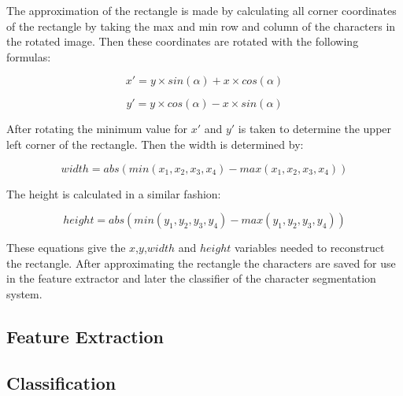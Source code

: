 The approximation of the rectangle is made by calculating  all corner coordinates of the rectangle by taking the max and min row and column of the characters in the rotated image. Then these coordinates are rotated with the following formulas:

\begin{equation}
    x' = y \times sin(\alpha) + x \times cos(\alpha)
\end{equation}

\begin{equation}
    y' = y \times cos(\alpha) - x \times sin(\alpha)
\end{equation}

After rotating the minimum value for $x'$ and $y'$ is taken to determine the upper left corner of the rectangle. Then the width is determined by:

\begin{equation}
    width = abs(min(x_1,x_2,x_3,x_4) - max(x_1,x_2,x_3,x_4))
\end{equation}

The height is calculated in a similar fashion:

\begin{equation}
    height = abs(min(y_1,y_2,y_3,y_4) - max(y_1,y_2,y_3,y_4))
\end{equation}

These equations give the $x$,$y$,$width$ and $height$ variables needed to reconstruct the rectangle. After approximating the rectangle the characters are saved for use in the feature extractor and later the classifier of the character segmentation system.

\subsection{Feature Extraction}

\subsection{Classification}

